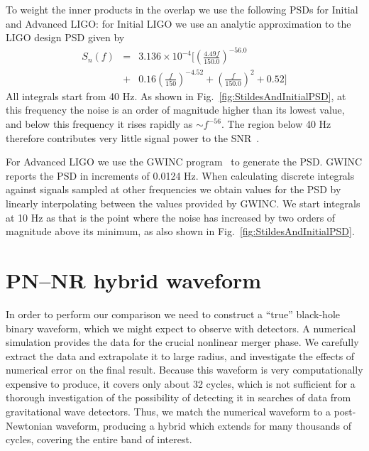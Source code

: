 To weight the inner products in the overlap we use the
following PSDs for Initial and Advanced LIGO: for Initial LIGO we use
an analytic approximation to the LIGO design PSD given by
\begin{eqnarray}
  S_n(f) &= &3.136 \times 10^{-4} \bigg[
  \left(\frac{ 4.49 f}{150.0}\right)^{-56.0} \nonumber \\
  &+ & 0.16 \left(\frac{f}{150}\right)^{-4.52}
  + \left(\frac{f}{150.0}\right)^2 + 0.52
  \bigg]
\end{eqnarray}
All integrals start from 40 Hz.  As shown in
Fig.~\ref{fig:StildesAndInitialPSD}, at this frequency the noise is an
order of magnitude higher than its lowest value, and below this
frequency it rises rapidly as $\sim f^{-56}$.  The region below 40 Hz
therefore contributes very little signal power to the
SNR~\cite{Abbott:2007xi}.  

For Advanced LIGO we use the GWINC program~\cite{AdvancedLIGONoise} to
generate the PSD.  GWINC reports the PSD in increments of 0.0124 Hz.
When calculating discrete integrals against signals sampled at other
frequencies we obtain values for the PSD by linearly interpolating
between the values provided by GWINC.  We start integrals at 10 Hz as
that is the point where the noise has increased by two orders of
magnitude above its minimum, as also shown in
Fig.~\ref{fig:StildesAndInitialPSD}.




\section{PN--NR hybrid waveform}
\label{sec:PNNRHybridWaveform} %


In order to perform our comparison we need to construct a ``true''
black-hole binary waveform, which we might expect to observe with
detectors.  A numerical simulation provides the data for the crucial
nonlinear merger phase.  We carefully extract the data and extrapolate
it to large radius, and investigate the effects of numerical error on
the final result.  Because this waveform is very computationally
expensive to produce, it covers only about 32 cycles, which is not
sufficient for a thorough investigation of the possibility of
detecting it in searches of data from gravitational wave detectors.
Thus, we match the numerical waveform to a post-Newtonian waveform,
producing a hybrid which extends for many thousands of cycles,
covering the entire band of interest.

